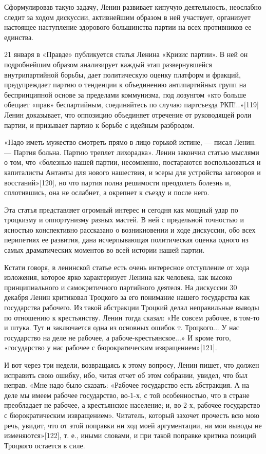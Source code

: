 \documentclass[12pt, a4paper, openany]{book}
\begin{document}
Сформулировав такую задачу, Ленин развивает кипучую деятельность, неослабно следит за ходом дискуссии, активнейшим образом в ней участвует, организует настоящее наступление здорового большинства партии на всех противников ее единства.

21 января в «Правде» публикуется статья Ленина «Кризис партии». В ней он подробнейшим образом анализирует каждый этап развернувшейся внутрипартийной борьбы, дает политическую оценку платформ и фракций, предупреждает партию о тенденции к объединению антипартийных групп на беспринципной основе за пределами коммунизма, под лозунгом «кто больше обещает «прав» беспартийным, соединяйтесь по случаю партсъезда РКП!..»[119] Ленин доказывает, что оппозицию объединяет отречение от руководящей роли партии, и призывает партию к борьбе с идейным разбродом.

«Надо иметь мужество смотреть прямо в лицо горькой истине, — писал Ленин. — Партия больна. Партию треплет лихорадка». Ленин закончил статью мыслями о том, что «болезнью нашей партии, несомненно, постараются воспользоваться и капиталисты Антанты для нового нашествия, и эсеры для устройства заговоров и восстаний»[120], но что партия полна решимости преодолеть болезнь и, сплотившись, она не ослабнет, а окрепнет к съезду и после него.

Эта статья представляет огромный интерес и сегодня как мощный удар по троцкизму и оппортунизму разных мастей. В ней с предельной точностью и ясностью конспективно рассказано о возникновении и ходе дискуссии, обо всех перипетиях ее развития, дана исчерпывающая политическая оценка одного из самых драматических моментов во всей истории нашей партии.

Кстати говоря, в ленинской статье есть очень интересное отступление от хода изложения, которое ярко характеризует Ленина как человека, как высоко принципиального и самокритичного партийного деятеля. На дискуссии 30 декабря Ленин критиковал Троцкого за его понимание нашего государства как государства рабочего. Из такой абстракции Троцкий делал неправильные выводы по отношению к крестьянству. Ленин тогда сказал: «Не совсем рабочее, в том-то и штука. Тут и заключается одна из основных ошибок т. Троцкого... У нас государство на деле не рабочее, а рабоче-крестьянское...» И кроме того, «государство у нас рабочее с бюрократическим извращением»[121].

И вот через три недели, возвращаясь к этому вопросу, Ленин пишет, что должен исправить свою ошибку, ибо, читая отчет об этом собрании, увидел, что был неправ. «Мне надо было сказать: «Рабочее государство есть абстракция. А на деле мы имеем рабочее государство, во-1-х, с той особенностью, что в стране преобладает не рабочее, а крестьянское население; и, во-2-х, рабочее государство с бюрократическим извращением». Читатель, который захочет прочесть всю мою речь, увидит, что от этой поправки ни ход моей аргументации, ни мои выводы не изменяются»[122], т. е., иными словами, и при такой поправке критика позиций Троцкого остается в силе.
\end{document}
